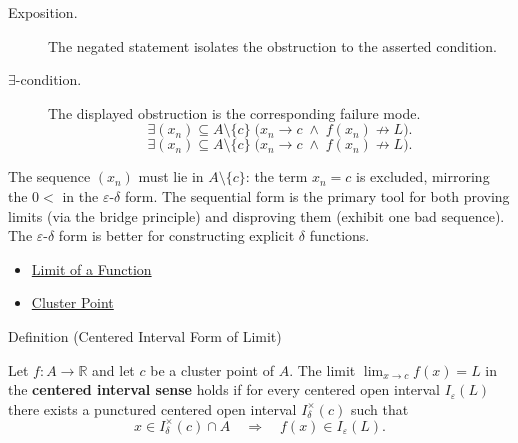 \begin{remark*}
\begin{description}
  \item[Exposition.]
  The negated statement isolates the obstruction to the asserted condition.

  \item[\(\exists\)-condition.]
  The displayed obstruction is the corresponding failure mode.
  \[
\exists (x_n) \subseteq A \setminus \{c\}\;
  \bigl(x_n \to c \;\wedge\; f(x_n) \not\to L\bigr).
  \]
  \[
\exists (x_n) \subseteq A \setminus \{c\}\;
  \bigl(x_n \to c \;\wedge\; f(x_n) \not\to L\bigr).
  \]
\end{description}
\end{remark*}



\begin{remark*}[Interpretation]
The sequence $(x_n)$ must lie in $A \setminus \{c\}$: the term
$x_n = c$ is excluded, mirroring the $0 <$ in the $\varepsilon$-$\delta$
form. The sequential form is the primary tool for both proving limits
(via the bridge principle) and disproving them (exhibit one bad
sequence). The $\varepsilon$-$\delta$ form is better for constructing
explicit $\delta$ functions.
\end{remark*}

\begin{dependencies}
\begin{itemize}
  \item \hyperref[def:limit-function]{Limit of a Function}
  \item \hyperref[def:cluster-point-r]{Cluster Point}
\end{itemize}
\end{dependencies}


\begin{definitionbox}{Definition (Centered Interval Form of Limit)}
\begin{definition}
\label{def:limit-function-neighbourhood}
Let $f : A \to \mathbb{R}$ and let $c$ be a cluster point of $A$.
The limit $\lim_{x\to c}f(x)=L$ in the \textbf{centered interval
sense} holds if for every centered open interval
$I_\varepsilon(L)$ there exists a punctured centered open interval
$I_\delta^\times(c)$ such that
\[
  x\in I_\delta^\times(c)\cap A
  \quad\Longrightarrow\quad
  f(x)\in I_\varepsilon(L).
\]
\end{definition}
\end{definitionbox}

